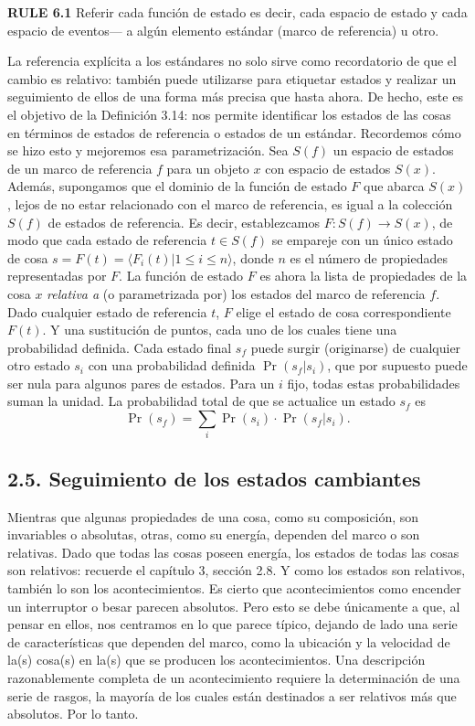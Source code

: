 \begin{justifying}
\textbf{RULE 6.1} Referir cada función de estado es decir, cada espacio de estado y cada espacio de eventos— a algún elemento estándar (marco de referencia) u otro.

La referencia explícita a los estándares no solo sirve como recordatorio de que el cambio es relativo: también puede utilizarse para etiquetar estados y realizar un seguimiento de ellos de una forma más precisa que hasta ahora. De hecho, este es el objetivo de la Definición 3.14: nos permite identificar los estados de las cosas en términos de estados de referencia o estados de un estándar. Recordemos cómo se hizo esto y mejoremos esa parametrización.
Sea $S(f)$ un espacio de estados de un marco de referencia $f$ para un objeto $x$ con espacio de estados $S(x)$. Además, supongamos que el dominio de la función de estado $F$ que abarca $S(x)$, lejos de no estar relacionado con el marco de referencia, es igual a la colección $S(f)$ de estados de referencia. Es decir, establezcamos $F: S(f) \to S(x)$, de modo que cada estado de referencia $t \in S(f)$ se empareje con un único estado de cosa $s=F(t) = \langle F_i(t)| 1 \le i \le n \rangle$, donde $n$ es el número de propiedades representadas por $F$. La función de estado $F$ es ahora la lista de propiedades de la cosa $x$ \textit{relativa a} (o parametrizada por) los estados del marco de referencia $f$. Dado cualquier estado de referencia $t$, $F$ elige el estado de cosa correspondiente $F(t)$. Y una sustitución de puntos, cada uno de los cuales tiene una probabilidad definida. Cada estado final $s_f$ puede surgir (originarse) de cualquier otro estado $s_i$ con una probabilidad definida $\Pr(s_f|s_i)$, que por supuesto puede ser nula para algunos pares de estados. Para un $i$ fijo, todas estas probabilidades suman la unidad. La probabilidad total de que se actualice un estado $s_f$ es
\[
\Pr(s_f) = \sum_i \Pr(s_i) \cdot \Pr(s_f|s_i).
\]

\subsection*{2.5. Seguimiento de los estados cambiantes}

Mientras que algunas propiedades de una cosa, como su composición, son invariables o absolutas, otras, como su energía, dependen del marco o son relativas. Dado que todas las cosas poseen energía, los estados de todas las cosas son relativos: recuerde el capítulo 3, sección 2.8. Y como los estados son relativos, también lo son los acontecimientos. Es cierto que acontecimientos como encender un interruptor o besar parecen absolutos. Pero esto se debe únicamente a que, al pensar en ellos, nos centramos en lo que parece típico, dejando de lado una serie de características que dependen del marco, como la ubicación y la velocidad de la(s) cosa(s) en la(s) que se producen los acontecimientos. Una descripción razonablemente completa de un acontecimiento requiere la determinación de una serie de rasgos, la mayoría de los cuales están destinados a ser relativos más que absolutos. Por lo tanto.


\end{justifying}
